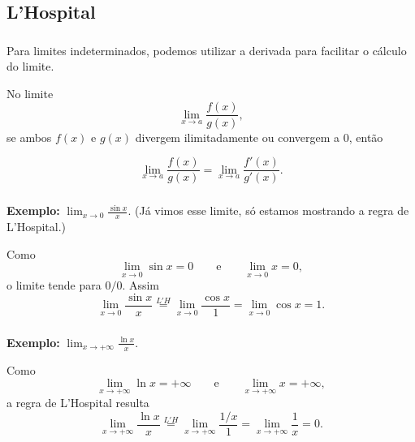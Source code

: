 \documentclass[10 pt]{beamer}
\newcommand{\myframe}[1]{
\begin{frame}
 \frametitle{\insertsection \qquad {\small \insertsubsection}}
#1
\end{frame}}
\newcommand{\limx}[1]{\lim_{x\rightarrow{#1}}}
\begin{document}
\subsection{L'Hospital}

\myframe {
  Para limites indeterminados, podemos utilizar a derivada para 
  facilitar o cálculo do limite.

  No limite $$\displaystyle \limx{a} \frac{f(x)}{g(x)},$$
  se ambos $f(x)$ e $g(x)$ divergem ilimitadamente ou convergem a $0$, então

  $$ \limx{a} \frac{f(x)}{g(x)} = \limx{a} \frac{f'(x)}{g'(x)}. $$
}

\myframe {
  {\bf Exemplo:} $\displaystyle\limx{0}\frac{\sin x}{x}$. (Já vimos esse limite,
    só estamos mostrando a regra de L'Hospital.)

  Como $$\limx{0}\sin x = 0 \qquad \mbox{e} \qquad \limx{0}x = 0,$$
    o limite tende para $0/0$. Assim 
    $$\limx{0} \frac{\sin x}{x} \overset{L'H}{=} \limx{0} \frac{\cos x}{1} 
      = \limx{0} \cos x = 1.$$
}

\myframe {
  {\bf Exemplo:} $\displaystyle \limx{+\infty} \frac{\ln x}{x}$.

  Como $$\limx{+\infty}\ln x = +\infty \qquad \mbox{e} \qquad
    \limx{+\infty} x = +\infty,$$
    a regra de L'Hospital resulta
    $$ \limx{+\infty} \frac{\ln x}{x} \overset{L'H}{=}
      \limx{+\infty} \frac{1/x}{1} = 
      \limx{+\infty} \frac{1}{x} = 0. $$
}
\end{document}
